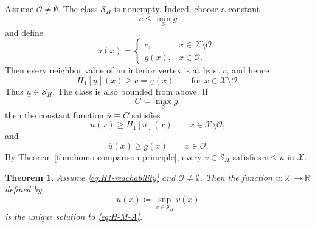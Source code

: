 \documentclass[reqno,11pt]{amsart}
\numberwithin{equation}{section}
\newtheorem{theorem}{Theorem}[section]
\theoremstyle{definition}
\theoremstyle{remark}
\begin{document}
Assume \(\mathcal O\ne\emptyset\). The class \(\mathcal S_H\) is nonempty. Indeed, choose a constant
\[
    c\le \min_{\mathcal O} g
\]
and define
\[
    \underline u(x)
    =
    \begin{cases}
        c, & x\in\mathcal X\setminus\mathcal O,\\
        g(x), & x\in\mathcal O.
    \end{cases}
\]
Then every neighbor value of an interior vertex is at least \(c\), and hence
\[
    H_1[\underline u](x)\ge c=\underline u(x)
    \qquad\text{for }x\in\mathcal X\setminus\mathcal O.
\]
Thus \(\underline u\in\mathcal S_H\). The class is also bounded from above. If
\[
    C\coloneqq \max_{\mathcal O} g,
\]
then the constant function \(\overline u\equiv C\) satisfies
\[
    \overline u(x) \geq H_1[\overline u](x)
    \qquad x \in\mathcal X\setminus\mathcal O,
\]
and
\[
    \overline u (x)\ge g (x)
    \qquad x\in\mathcal O.
\]
By Theorem \ref{thm:homo-comparison-principle}, every \(v\in\mathcal S_H\) satisfies \(v\le \overline u\) in \(\mathcal X\).

\begin{theorem}\label{thm:homo-perron}
Assume \eqref{eq:H1-reachability} and \(\mathcal O\ne\emptyset\). Then the function \(u\colon\mathcal X\to\mathbb R\) defined by
\[
    u(x)\coloneqq \sup_{v\in\mathcal S_H} v(x)
\]
is the unique solution to \eqref{eq:H-M-A}.
\end{theorem}
\end{document}
